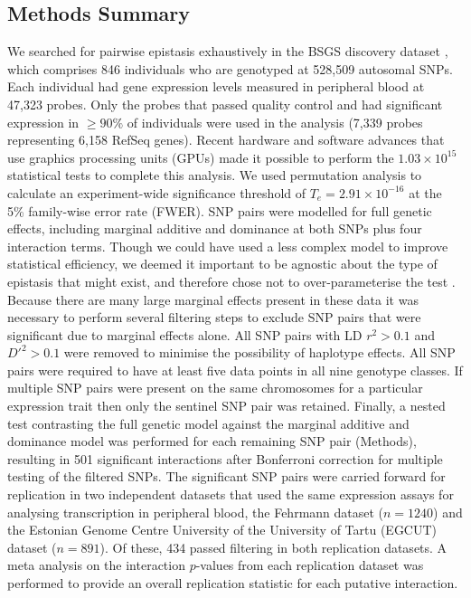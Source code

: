 \documentclass{article}
\begin{document}
\subsection*{Methods Summary}
We searched for pairwise epistasis exhaustively in the BSGS discovery dataset \cite{Powell2012}, which comprises 846 individuals who are genotyped at 528,509 autosomal SNPs. Each individual had gene expression levels measured in peripheral blood at 47,323 probes. Only the probes that passed quality control and had significant expression in $\geq 90\%$ of individuals were used in the analysis (7,339 probes representing 6,158 RefSeq genes). Recent hardware and software \cite{Hemani2011} advances that use graphics processing units (GPUs) made it possible to perform the $1.03 \times 10^{15}$ statistical tests to complete this analysis. We used permutation analysis \cite{Churchill1994a} to calculate an experiment-wide significance threshold of $T_{e} = 2.91 \times 10^{-16}$ at the 5\% family-wise error rate (FWER). SNP pairs were modelled for full genetic effects, including marginal additive and dominance at both SNPs plus four interaction terms. Though we could have used a less complex model to improve statistical efficiency, we deemed it important to be agnostic about the type of epistasis that might exist, and therefore chose not to over-parameterise the test \cite{Marchini2005, Hemani2013}. Because there are many large marginal effects present in these data it was necessary to perform several filtering steps to exclude SNP pairs that were significant due to marginal effects alone. All SNP pairs with LD $r^2 > 0.1$ and $D'^{2} > 0.1$ were removed to minimise the possibility of haplotype effects. All SNP pairs were required to have at least five data points in all nine genotype classes. If multiple SNP pairs were present on the same chromosomes for a particular expression trait then only the sentinel SNP pair was retained. Finally, a nested test contrasting the full genetic model against the marginal additive and dominance model was performed for each remaining SNP pair (Methods), resulting in 501 significant interactions after Bonferroni correction for multiple testing of the filtered SNPs. The significant SNP pairs were carried forward for replication in two independent datasets that used the same expression assays for analysing transcription in peripheral blood, the Fehrmann dataset \cite{Fehrmann2011} ($n=1240$) and the Estonian Genome Centre University of the University of Tartu (EGCUT) dataset \cite{Metspalu2004} ($n=891$). Of these, 434 passed filtering in both replication datasets. A meta analysis on the interaction $p$-values from each replication dataset was performed to provide an overall replication statistic for each putative interaction.
\end{document}
